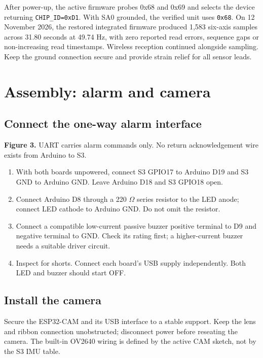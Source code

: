 \documentclass[11pt,a4paper]{article}
\newcommand{\file}[1]{\nolinkurl{#1}}
\newcommand{\page}[1]{\clearpage\section{#1}}
\begin{document}
After power-up, the active firmware probes 0x68 and 0x69 and selects the device returning \file{CHIP_ID=0xD1}. With SA0 grounded, the verified unit uses \file{0x68}. On 12 November 2026, the restored integrated firmware produced 1,583 six-axis samples across 31.80 seconds at 49.74 Hz, with zero reported read errors, sequence gaps or non-increasing read timestamps. Wireless reception continued alongside sampling. Keep the ground connection secure and provide strain relief for all sensor leads.
\page{Assembly: alarm and camera}
\subsection{Connect the one-way alarm interface}
\begin{center}
\end{center}
\textbf{Figure 3.} UART carries alarm commands only. No return acknowledgement wire exists from Arduino to S3.
\begin{enumerate}
\item With both boards unpowered, connect S3 GPIO17 to Arduino D19 and S3 GND to Arduino GND. Leave Arduino D18 and S3 GPIO18 open.
\item Connect Arduino D8 through a 220 $\Omega$ series resistor to the LED anode; connect LED cathode to Arduino GND. Do not omit the resistor.
\item Connect a compatible low-current passive buzzer positive terminal to D9 and negative terminal to GND. Check its rating first; a higher-current buzzer needs a suitable driver circuit.
\item Inspect for shorts. Connect each board's USB supply independently. Both LED and buzzer should start OFF.
\end{enumerate}
\subsection{Install the camera}
Secure the ESP32-CAM and its USB interface to a stable support. Keep the lens and ribbon connection unobstructed; disconnect power before reseating the camera. The built-in OV2640 wiring is defined by the active CAM sketch, not by the S3 IMU table.
\end{document}
